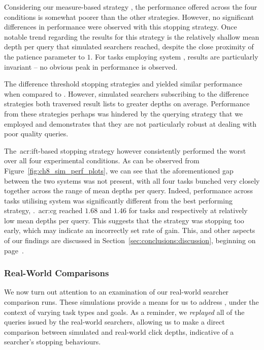 Considering our measure-based strategy , the performance offered across the four conditions is somewhat poorer than the other strategies. However, no significant differences in performance were observed with this stopping strategy. Once notable trend regarding the results for this strategy is the relatively shallow mean depth per query that simulated searchers reached, despite the close proximity of the patience parameter to $1$. For tasks employing system , results are particularly invariant -- no obvious peak in performance is observed.

The difference threshold stopping strategies  and  yielded similar performance when compared to . However, simulated searchers subscribing to the difference strategies both traversed result lists to greater depths on average. Performance from these strategies perhaps was hindered by the querying strategy that we employed and demonstrates that they are not particularly robust at dealing with poor quality queries.

The~\gls{acr:ift}-based stopping strategy  however consistently performed the worst over all four experimental conditions. As can be observed from Figure~\ref{fig:ch8_sim_perf_plots}, we can see that the aforementioned gap between the two systems was not present, with all four tasks bunched very closely together across the range of mean depths per query. Indeed, performance across tasks utilising system  was significantly different from the best performing strategy, .~\gls{acr:cg} reached $1.68$ and $1.46$ for tasks  and  respectively at relatively low mean depths per query. This suggests that the strategy was stopping too early, which may indicate an incorrectly set rate of gain. This, and other aspects of our findings are discussed in Section~\ref{sec:conclusions:discussion}, beginning on page~\pageref{sec:conclusions:discussion}.

\subsubsection{Real-World Comparisons}\label{sec:diversity:simulated:results:comparisons}
We now turn out attention to an examination of our real-world searcher comparison runs. These simulations provide a means for us to address , under the context of varying task types and goals. As a reminder, we \emph{replayed} all of the queries issued by the real-world searchers, allowing us to make a direct comparison between simulated and real-world click depths, indicative of a searcher's stopping behaviours.

